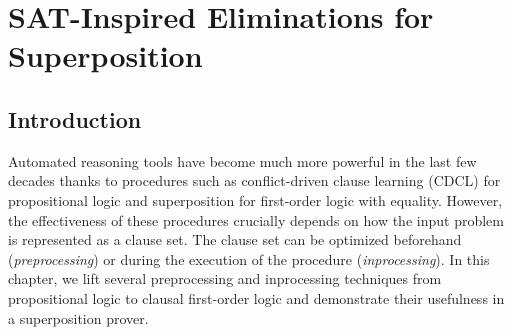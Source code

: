 \chapter{SAT-Inspired Eliminations for Superposition}
\label{ch:satfol}

\newcommand{\paper}[0]{chapter}
\newcommand{\cor}{\ensuremath{\mathrel{\lor}}}
\newcommand\MAX[1]{\smash{\setlength{\fboxsep}{.3ex}\colorbox{light-gray}{\ensuremath{\vphantom{('q}{#1}}}}}





\begin{abstract}
Optimized SAT solvers not only simplify the clause set during preprocessing, but
they also simplify it during solving. This interleaving of
simplification and solving is called inprocessing. Some preprocessing
techniques have been generalized to first-order logic with equality. In this
\paper, we port inprocessing techniques to work with superposition, a leading
first-order proof calculus, and we strengthen known preprocessing techniques.
Specifically, we look into elimination of hidden literals, variables
(predicates), and blocked clauses. Our evaluation using the Zipperposition
prover confirms that the new techniques usefully supplement the existing
superposition machinery.
\end{abstract}


\newpage

\section{Introduction}
\label{sec:satfol:introduction}

Automated reasoning tools have become much more powerful in the last few decades
thanks to procedures such as conflict-driven clause learning (CDCL)
\cite{MSLM09HBSAT} for propositional logic and superposition for first-order
logic with equality. However, the effectiveness of these procedures crucially
depends on how the input problem is represented as a clause set. The clause set
can be optimized beforehand (\emph{preprocessing}) or during the execution of
the procedure (\emph{inprocessing}). In this \paper, we lift several
preprocessing and inprocessing techniques from propositional logic to clausal
first-order logic and demonstrate their usefulness in a superposition prover.

